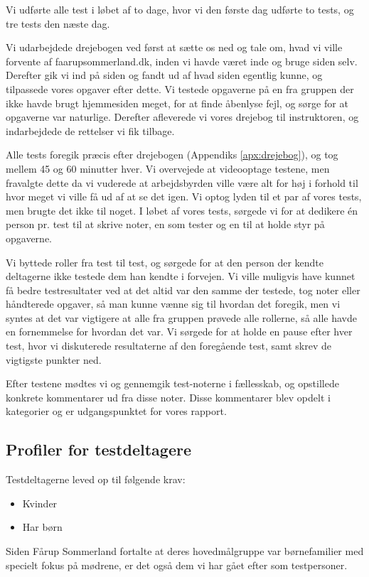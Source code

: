 \documentclass[10pt,a4paper]{article}      %
\begin{document}
Vi udførte alle test i løbet af to dage, hvor vi den første dag udførte to
tests, og tre tests den næste dag.

Vi udarbejdede drejebogen ved først at sætte os ned og tale om, hvad vi ville
forvente af faarupsommerland.dk, inden vi havde været inde og bruge siden selv.
Derefter gik vi ind på siden og fandt ud af hvad siden egentlig kunne, og
tilpassede vores opgaver efter dette. Vi testede opgaverne på en fra gruppen der
ikke havde brugt hjemmesiden meget, for at finde åbenlyse fejl, og sørge for at
opgaverne var naturlige. Derefter afleverede vi vores drejebog til instruktoren,
og indarbejdede de rettelser vi fik tilbage.

Alle tests foregik præcis efter drejebogen (Appendiks \ref{apx:drejebog}), og
tog mellem 45 og 60 minutter hver.  Vi overvejede at videooptage testene, men
fravalgte dette da vi vuderede at arbejdsbyrden ville være alt for høj i forhold
til hvor meget vi ville få ud af at se det igen. Vi optog lyden til et par af
vores tests, men brugte det ikke til noget.  I løbet af vores tests, sørgede vi
for at dedikere én person pr. test til at skrive noter, en som tester og en til
at holde styr på opgaverne.

Vi byttede roller fra test til test, og sørgede for at den person der kendte
deltagerne ikke testede dem han kendte i forvejen. Vi ville muligvis have kunnet
få bedre testresultater ved at det altid var den samme der testede, tog noter
eller håndterede opgaver, så man kunne vænne sig til hvordan det foregik, men vi
syntes at det var vigtigere at alle fra gruppen prøvede alle rollerne, så alle
havde en fornemmelse for hvordan det var.  Vi sørgede for at holde en pause
efter hver test, hvor vi diskuterede resultaterne af den foregående test, samt
skrev de vigtigste punkter ned. 

Efter testene mødtes vi og gennemgik test-noterne i fællesskab, og opstillede
konkrete kommentarer ud fra disse noter. Disse kommentarer blev opdelt i
kategorier og er udgangspunktet for vores rapport.

\subsection{Profiler for testdeltagere}

Testdeltagerne leved op til følgende krav:
\begin{itemize}
\item Kvinder
\item Har børn
\end{itemize}
Siden Fårup Sommerland fortalte at deres hovedmålgruppe var børnefamilier med specielt fokus på mødrene, er det også dem vi har gået efter som testpersoner.
\end{document}
